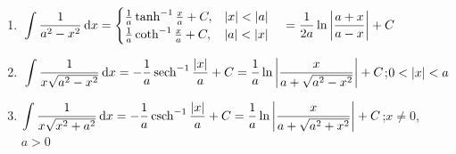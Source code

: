 \begin{minipage}[t]{.6\linewidth}
\begin{enumerate}
\item {$\intRuleStrut\ds\int\frac1{a^2-x^2}\dd x=\begin{cases}
\frac1a\tanh^{-1}\frac xa+C,&\abs x<\abs a\\
\frac1a\coth^{-1}\frac xa+C,&\abs a<\abs x
\end{cases}
\quad=\frac1{2a}\ln\abs{\frac{a+x}{a-x}}+C$}
\item $\intRuleStrut\ds\int\frac1{x\sqrt{a^2-x^2}}\dd x=-\frac1a\sech^{-1}\frac{\abs x}a+C=\frac1a\ln\abs{\frac x{a+\sqrt{a^2-x^2}}}+C$;\quad $0<\left\lvert x \right\rvert<a$
\item $\displaystyle\int\frac1{x\sqrt{x^2+a^2}}\operatorname{d}\! x=-\frac1a\operatorname{csch}^{-1}\frac{\left\lvert x \right\rvert}a+C=
\frac1a\ln\left\lvert \frac{x}{a+\sqrt{a^2+x^2}} \right\rvert
+C$;\quad $x\ne0$, $a>0$
\end{enumerate}
\end{minipage}
\egroup


\clearpage

